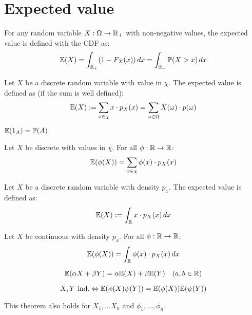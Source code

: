 \section{Expected value}

For any random variable \(X: \Omega \to \mathbb{R}_+\) with non-negative values, the expected value is defined with the CDF as:
\[\mathbb{E}(X) = \int_{\mathbb{R}_+} (1 - F_X(x)) \, dx = \int_{\mathbb{R}_+} \mathbb{P}(X > x) \, dx\]

\begin{ddefinition*}
  Let \(X\) be a discrete random variable with value in \(\chi\). The expected value is defined as (if the sum is well defined):
  \[\mathbb{E}(X) := \sum_{x \in \chi}x \cdot p_X(x) = \sum_{\omega \in \Omega} X(\omega) \cdot p(\omega)\]
\end{ddefinition*}

\begin{proposition}
  {\small \(\mathbb{E}(1_A) = \mathbb{P}(A)\)}
\end{proposition}

\begin{dtheorem*}
  Let \(X\) be discrete with values in \(\chi\). For all \(\phi: \mathbb{R} \to \mathbb{R}\):
  \[\mathbb{E}(\phi(X)) = \sum_{x \in \chi}\phi(x) \cdot p_X(x)\]
\end{dtheorem*}

\begin{cdefinition*}
  Let \(X\) be a discrete random variable with density \(p_x\). The expected value is defined as:
  \[\mathbb{E}(X) := \int_{\mathbb{R}} x \cdot p_X(x) \,dx\]
\end{cdefinition*}

\begin{ctheorem*}
  Let \(X\) be continuous with density \(p_x\). For all \(\phi: \mathbb{R} \to \mathbb{R}\):
  \[\mathbb{E}(\phi(X)) = \int_{\mathbb{R}} \phi(x) \cdot p_X(x) \, dx\]
\end{ctheorem*}

\begin{theorem*}
  \[\mathbb{E}(\alpha X + \beta Y) = \alpha \mathbb{E}(X) + \beta \mathbb{E}(Y) \quad (a, b \in \mathbb{R})\]
\end{theorem*}

\begin{theorem*}
  \[X, Y \ \text{ind.} \Leftrightarrow \mathbb{E}(\phi(X) \psi(Y)) = \mathbb{E}(\phi(X)) \mathbb{E}(\psi(Y))\]
\end{theorem*}
This theorem also holds for \(X_1, \ldots X_n\) and \(\phi_1, \ldots, \phi_n\).

